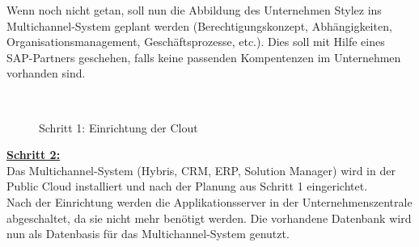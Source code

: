 Wenn noch nicht getan, soll nun die Abbildung des Unternehmen Stylez ins Multichannel-System geplant werden (Berechtigungskonzept, Abhängigkeiten, Organisationsmanagement, Geschäftsprozesse, etc.).
Dies soll mit Hilfe eines SAP-Partners geschehen, falls keine passenden Kompentenzen im Unternehmen vorhanden sind.
\begin{figure}[H]
\centering
\begin{minipage}[t]{0.9\textwidth}
{\centering{}\\}
\caption{Schritt 1: Einrichtung der Clout} %
\end{minipage}
\end{figure}
\newpage

\textbf{\underline{Schritt 2:}}\\
Das Multichannel-System (Hybris, CRM, ERP, Solution Manager) wird in der Public Cloud installiert und nach der Planung aus Schritt 1 eingerichtet.\\
Nach der Einrichtung werden die Applikationsserver in der Unternehmenszentrale abgeschaltet, da sie nicht mehr benötigt werden. Die vorhandene Datenbank wird nun als Datenbasis für das Multichannel-System genutzt.

